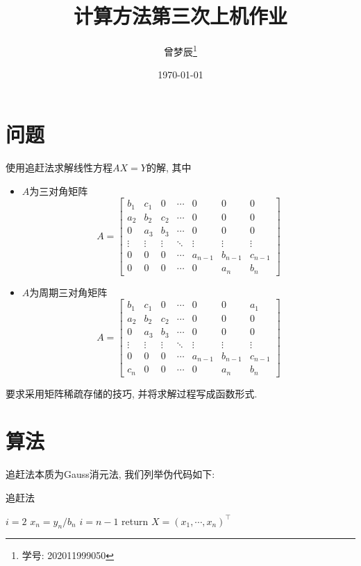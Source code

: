 \documentclass{article}
\title{计算方法第三次上机作业}
\author{曾梦辰\thanks{学号: 202011999050}}
\date{\today}
\begin{document}
\maketitle

\section{问题}
使用追赶法求解线性方程$AX=Y$的解, 其中
\begin{itemize}
    \item $A$为三对角矩阵
    \[A=\begin{bmatrix}
        b_1 & c_1 & 0 & \cdots & 0 & 0 & 0 \\
        a_2 & b_2 & c_2 & \cdots & 0 & 0 & 0 \\
        0 & a_3 & b_3 & \cdots & 0 & 0 & 0 \\
        \vdots & \vdots & \vdots & \ddots & \vdots & \vdots & \vdots \\
        0 & 0 & 0 & \cdots & a_{n-1} & b_{n-1} & c_{n-1} \\
        0 & 0 & 0 & \cdots & 0 & a_n & b_n
    \end{bmatrix}\]
    \item $A$为周期三对角矩阵
    \[A=\begin{bmatrix}
        b_1 & c_1 & 0 & \cdots & 0 & 0 & a_1 \\
        a_2 & b_2 & c_2 & \cdots & 0 & 0 & 0 \\
        0 & a_3 & b_3 & \cdots & 0 & 0 & 0 \\
        \vdots & \vdots & \vdots & \ddots & \vdots & \vdots & \vdots \\
        0 & 0 & 0 & \cdots & a_{n-1} & b_{n-1} & c_{n-1} \\
        c_n & 0 & 0 & \cdots & 0 & a_n & b_n
    \end{bmatrix}\]
\end{itemize}
要求采用矩阵稀疏存储的技巧, 并将求解过程写成函数形式.

\section{算法}

追赶法本质为Gauss消元法, 我们列举伪代码如下:

\begin{algorithm}[H]
    \caption{追赶法}
    $i=2$\;
    $x_n=y_n/b_n$\;
    $i=n-1$\;
    return $X=(x_1,\cdots,x_n)^\top$\;
\end{algorithm}
\end{document}
